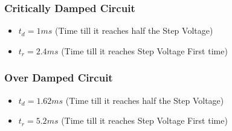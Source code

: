 \documentclass{article}
\begin{document}
\subsubsection{Critically Damped Circuit}
\begin{itemize}
    \item $t_d = 1 ms$ (Time till it reaches half the Step Voltage)
    \item $t_r = 2.4 ms$ (Time till it reaches Step Voltage First time)
\end{itemize}

\subsubsection{Over Damped Circuit}
\begin{itemize}
    \item $t_d = 1.62ms$ (Time till it reaches half the Step Voltage)
    \item $t_r = 5.2 ms$ (Time till it reaches Step Voltage First time)
\end{itemize}
\vspace{10px}
\begin{center}
\end{center}

\newpage
\end{document}
